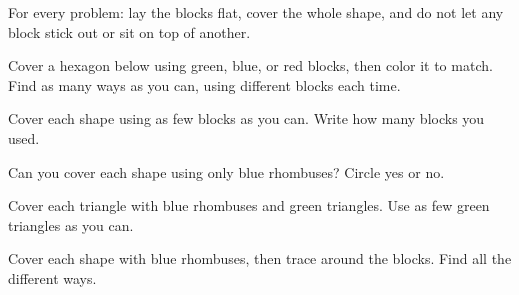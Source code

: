 \documentclass[14pt]{extarticle}
\begin{document}
For every problem: lay the blocks flat, cover the whole shape, and do not let
any block stick out or sit on top of another.

\bigskip
{}Cover a hexagon below using green, blue, or red blocks, then color it
to match. Find as many ways as you can, using different blocks each time.

\medskip
\par\noindent {}\blkgap{}\blkgap{}\par
\vspace{0.3in}

\newpage
{}Cover each shape using as few blocks as you can. Write how many
blocks you used.

\medskip
\par\noindent {}\blkgap{}\par\smallskip\noindent{}\blkgap{}\par
\vspace{0.3in}

\newpage
{}Can you cover each shape using only blue rhombuses? Circle yes or no.

\medskip
\par\noindent {}\par
\vspace{0.3in}

\newpage
{}Cover each triangle with blue rhombuses and green triangles. Use as
few green triangles as you can.

\medskip
\par\noindent {}\blkgap{}\par
\vspace{0.3in}

\newpage
{}Cover each shape with blue rhombuses, then trace around the blocks.
Find all the different ways.

\medskip
\par\noindent {}\par
\vspace{0.3in}
\end{document}
